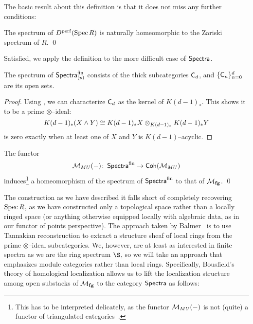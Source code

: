 The basic result about this definition is that it does not miss any further conditions:

\begin{theorem}
The spectrum of $D^{\mathrm{perf}}(\operatorname{Spec} R)$ is naturally homeomorphic to the Zariski spectrum of $R$. \qed
\end{theorem}

\noindent Satisfied, we apply the definition to the more difficult case of $\mathsf{Spectra}$.

\begin{theorem}
The spectrum of $\mathsf{Spectra}_{(p)}^{\mathrm{fin}}$ consists of the thick subcategories $\mathsf{C}_d$, and $\{\mathsf{C}_n\}_{n=0}^d$ are its open sets.
\end{theorem}
\begin{proof}
Using , we can characterize $\mathsf{C}_d$ as the kernel of $K(d-1)_*$.  This shows it to be a prime $\otimes$--ideal: \[K(d-1)_*(X \wedge Y) \cong K(d-1)_* X \otimes_{K(d-1)_*} K(d-1)_* Y\] is zero exactly when at least one of $X$ and $Y$ is $K(d-1)$--acyclic.
\end{proof}

\begin{corollary}
The functor \[\mathcal{M}_{MU}(-)\colon\thinspace \mathsf{Spectra}^{\mathrm{fin}} \to \mathsf{Coh}(\mathcal{M}_{MU})\] induces\footnote{This has to be interpreted delicately, as the functor $\mathcal{M}_{MU}(-)$ is not (quite) a functor of triangulated categories~\cite[2.4.2]{MoravaCplxBordismInAT}.} a homeomorphism of the spectrum of $\mathsf{Spectra}^{\mathrm{fin}}$ to that of $\mathcal{M}_{\mathbf{fg}}$. \qed
\end{corollary}

The construction as we have described it falls short of completely recovering $\operatorname{Spec} R$, as we have constructed only a topological space rather than a locally ringed space (or anything otherwise equipped locally with algebraic data, as in our functor of points perspective).  The approach taken by Balmer~\cite[Section 6]{Balmer} is to use Tannakian reconstruction to extract a structure sheaf of local rings from the prime $\otimes$--ideal subcategories.  We, however, are at least as interested in finite spectra as we are the ring spectrum $\S$, so we will take an approach that emphasizes module categories rather than local rings.  Specifically, Bousfield's theory of homological localization allows us to lift the localization structure among open substacks of $\mathcal{M}_{\mathbf{fg}}$ to the category $\mathsf{Spectra}$ as follows:

